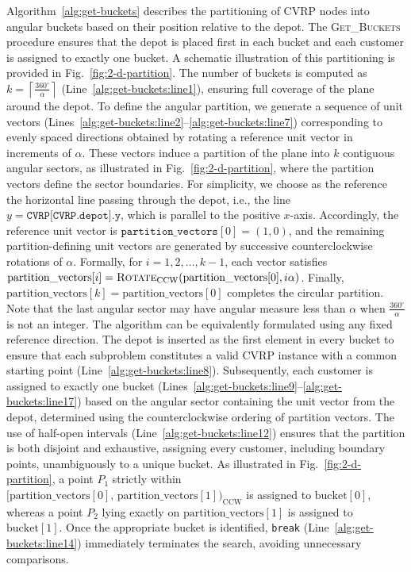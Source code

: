 
Algorithm~\ref{alg:get-buckets} describes the partitioning of CVRP nodes into angular buckets based on their position relative to the depot. The \textsc{Get\_Buckets} procedure ensures that the depot is placed first in each bucket and each customer is assigned to exactly one bucket. A schematic illustration of this partitioning is provided in Fig.~\ref{fig:2-d-partition}. The number of buckets is computed as $k = \left\lceil \frac{360^\circ}{\alpha} \right\rceil$ (Line~\ref{alg:get-buckets:line1}), ensuring full coverage of the plane around the depot. To define the angular partition, we generate a sequence of unit vectors (Lines~\ref{alg:get-buckets:line2}--\ref{alg:get-buckets:line7}) corresponding to evenly spaced directions obtained by rotating a reference unit vector in increments of $\alpha$. These vectors induce a partition of the plane into $k$ contiguous angular sectors, as illustrated in Fig.~\ref{fig:2-d-partition}, where the partition vectors define the sector boundaries. For simplicity, we choose as the reference the horizontal line passing through the depot, i.e., the line $y=\texttt{CVRP[CVRP.depot].y}$, which is parallel to the positive $x$-axis. Accordingly, the reference unit vector is $\texttt{partition\_vectors}[0]=(1,0)$, and the remaining partition-defining unit vectors are generated by successive counterclockwise rotations of $\alpha$. Formally, for $i = 1, 2, \dots, k-1$, each vector satisfies $\text{partition\_vectors}[i] = \textsc{Rotate}_{\mathrm{CCW}}(\text{partition\_vectors}[0], i\alpha)$. Finally, $\text{partition\_vectors}[k] \allowbreak = \text{partition\_vectors}[0]$ completes the circular partition. Note that the last angular sector may have angular measure less than $\alpha$ when $\frac{360^\circ}{\alpha}$ is not an integer. The algorithm can be equivalently formulated using any fixed reference direction. The depot is inserted as the first element in every bucket to ensure that each subproblem constitutes a valid CVRP instance with a common starting point (Line~\ref{alg:get-buckets:line8}). Subsequently, each customer is assigned to exactly one bucket (Lines~\ref{alg:get-buckets:line9}--\ref{alg:get-buckets:line17}) based on the angular sector containing the unit vector from the depot, determined using the counterclockwise ordering of partition vectors. The use of half-open intervals (Line~\ref{alg:get-buckets:line12}) ensures that the partition is both disjoint and exhaustive, assigning every customer, including boundary points, unambiguously to a unique bucket. As illustrated in Fig.~\ref{fig:2-d-partition}, a point $P_1$ strictly within $[\text{partition\_vectors}[0],\, \allowbreak \text{partition\_vectors}[1])_{\text{CCW}}$ is assigned to $\text{bucket}[0]$, whereas a point $P_2$ lying exactly on \allowbreak $\text{partition\_vectors}[1]$ is assigned to $\text{bucket}[1]$. Once the appropriate bucket is identified, \texttt{break} (Line~\ref{alg:get-buckets:line14}) immediately terminates the search, avoiding unnecessary comparisons.




